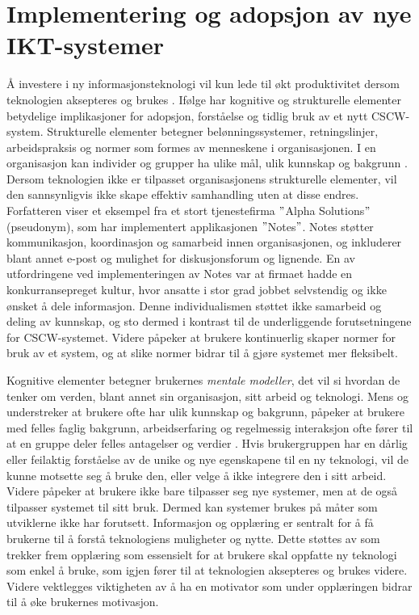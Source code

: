 \section{Implementering og adopsjon av nye IKT-systemer}
\label{sec:implementering}
Å investere i ny informasjonsteknologi vil kun lede til økt produktivitet dersom teknologien aksepteres og brukes \citep{Venkatesh99}. Ifølge \citet{Orlikowski92} har kognitive og strukturelle elementer betydelige implikasjoner for adopsjon, forståelse og tidlig bruk av et nytt CSCW-system. Strukturelle elementer betegner belønningssystemer, retningslinjer, arbeidspraksis og normer som formes av menneskene i organisasjonen. I en organisasjon kan individer og grupper ha ulike mål, ulik kunnskap og bakgrunn \citep{Ackermann00}. Dersom teknologien ikke er tilpasset organisasjonens strukturelle elementer, vil den sannsynligvis ikke skape effektiv samhandling uten at disse endres. Forfatteren viser et eksempel fra et stort tjenestefirma $"$Alpha Solutions$"$ (pseudonym), som har implementert applikasjonen $"$Notes$"$. Notes støtter kommunikasjon, koordinasjon og samarbeid innen organisasjonen, og inkluderer blant annet e-post og mulighet for diskusjonsforum og lignende. En av utfordringene ved implementeringen av Notes var at firmaet hadde en konkurransepreget kultur, hvor ansatte i stor grad jobbet selvstendig og ikke ønsket å dele informasjon. Denne individualismen støttet ikke samarbeid og deling av kunnskap, og sto dermed i kontrast til de underliggende forutsetningene for CSCW-systemet. Videre påpeker \citet{Ackermann00} at brukere kontinuerlig skaper normer for bruk av et system, og at slike normer bidrar til å gjøre systemet mer fleksibelt.
 
\noindent
Kognitive elementer betegner brukernes \textit{mentale modeller}, det vil si hvordan de tenker om verden, blant annet sin organisasjon, sitt arbeid og teknologi. Mens \citet{Berg99} og \citet{Ackermann00} understreker at brukere ofte har ulik kunnskap og bakgrunn, påpeker \citep{Orlikowski92} at brukere med felles faglig bakgrunn, arbeidserfaring og regelmessig interaksjon ofte fører til at en gruppe deler felles antagelser og verdier . Hvis brukergruppen har en dårlig eller feilaktig forståelse av de unike og nye egenskapene til en ny teknologi, vil de kunne motsette seg å bruke den, eller velge å ikke integrere den i sitt arbeid. Videre påpeker \citet{Ackermann00} at brukere ikke bare tilpasser seg nye systemer, men at de også tilpasser systemet til sitt bruk. Dermed kan systemer brukes på måter som utviklerne  ikke har forutsett. Informasjon og opplæring er sentralt for å få brukerne til å forstå teknologiens muligheter og nytte. Dette støttes av \citet{Venkatesh99} som trekker frem opplæring som essensielt for at brukere skal oppfatte ny teknologi som enkel å bruke, som igjen fører til at teknologien aksepteres og brukes videre. Videre vektlegges viktigheten av å ha en motivator som under opplæringen bidrar til å øke brukernes motivasjon.
 
